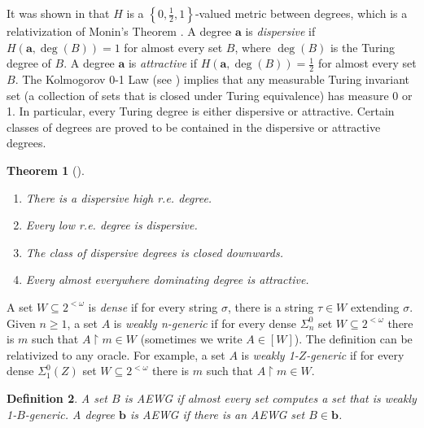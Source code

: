 \documentclass[11pt]{amsart}
\newtheorem{theorem}{Theorem}
\newtheorem{definition}[theorem]{Definition}
\begin{document}
It was shown in {\cite{MR4741732}} that $H$ is a $\left\{ 0, \frac{1}{2}, 1 \right\}$-valued metric between degrees, which is a relativization of Monin's Theorem {\cite{MR3883780}}.
A degree $\mathbf{a}$ is {\emph{dispersive}}
if $H (\mathbf{a}, \deg (B)) = 1$ for almost every set $B$, where $\deg (B)$
is the Turing degree of $B$. A degree $\mathbf{a}$ is {\emph{attractive}} if
$H (\mathbf{a}, \deg (B)) = \frac{1}{2}$ for almost every set $B$. The
Kolmogorov 0-1 Law (see {\cite{MR2732288}}) implies that any measurable Turing
invariant set (a collection of sets that is closed under Turing equivalence)
has measure 0 or 1. In particular, every Turing degree is either dispersive or
attractive. Certain classes of degrees are proved to be contained in the
dispersive or attractive degrees.

\begin{theorem}[{\cite{MR4741732}}]
  \label{1}
  \begin{enumerate}
  
      \item There is a dispersive high r.e. degree.
      \item Every low r.e. degree is dispersive.
      \item The class of dispersive degrees is closed downwards.
      \item Every almost everywhere dominating degree is attractive.
  \end{enumerate}
\end{theorem}

A set $W \subseteq 2^{< \omega}$ is {\emph{dense}} if for every string
$\sigma$, there is a string $\tau \in W$ extending $\sigma$. Given $n \geq 1$,
a set $A$ is {\emph{weakly n-generic}} if for every dense $\Sigma^0_n$ set $W
\subseteq 2^{< \omega}$ there is $m$ such that $A \upharpoonright m \in W$
(sometimes we write $A \in [W]$). The definition can be relativized to any
oracle. For example, a set $A$ is {\emph{weakly 1-$Z$-generic}} if for
every dense $\Sigma^{0}_1(Z)$ set $W \subseteq 2^{< \omega}$ there is $m$ such
that $A \upharpoonright m \in W$.

\begin{definition}
  A set $B$ is {\emph{AEWG}} if almost every set computes a set
  that is weakly 1-$B$-generic. A degree $\mathbf{b}$ is AEWG if there is an AEWG
  set $B \in\mathbf{b}$.
\end{definition}
\end{document}
